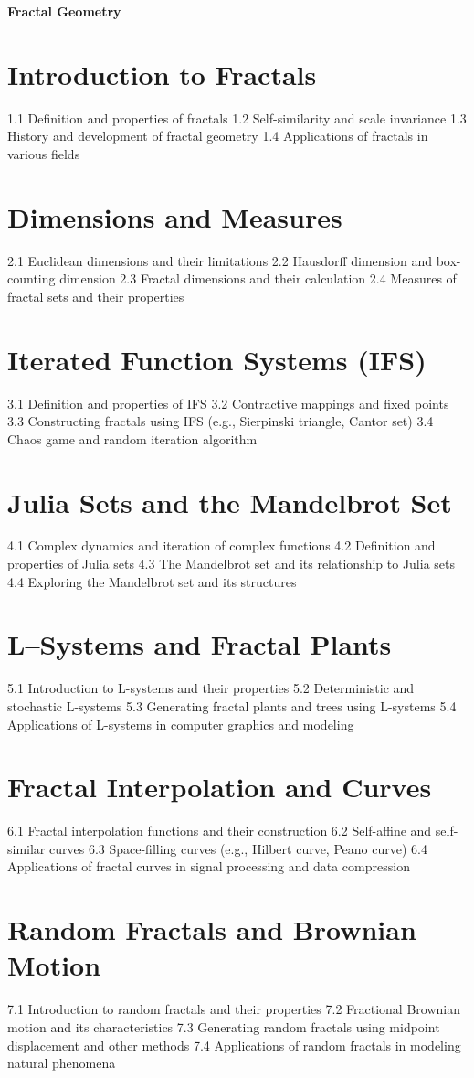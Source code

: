 {\LARGE \bf{Fractal Geometry}}
\section{Introduction to Fractals}
1.1 Definition and properties of fractals
1.2 Self-similarity and scale invariance
1.3 History and development of fractal geometry
1.4 Applications of fractals in various fields
\section{Dimensions and Measures}
2.1 Euclidean dimensions and their limitations
2.2 Hausdorff dimension and box-counting dimension
2.3 Fractal dimensions and their calculation
2.4 Measures of fractal sets and their properties
\section{Iterated Function Systems (IFS)}
3.1 Definition and properties of IFS
3.2 Contractive mappings and fixed points
3.3 Constructing fractals using IFS (e.g., Sierpinski triangle, Cantor set)
3.4 Chaos game and random iteration algorithm
\section{Julia Sets and the Mandelbrot Set}
4.1 Complex dynamics and iteration of complex functions
4.2 Definition and properties of Julia sets
4.3 The Mandelbrot set and its relationship to Julia sets
4.4 Exploring the Mandelbrot set and its structures
\section{L–Systems and Fractal Plants}
5.1 Introduction to L-systems and their properties
5.2 Deterministic and stochastic L-systems
5.3 Generating fractal plants and trees using L-systems
5.4 Applications of L-systems in computer graphics and modeling
\section{Fractal Interpolation and Curves}
6.1 Fractal interpolation functions and their construction
6.2 Self-affine and self-similar curves
6.3 Space-filling curves (e.g., Hilbert curve, Peano curve)
6.4 Applications of fractal curves in signal processing and data compression
\section{Random Fractals and Brownian Motion}
7.1 Introduction to random fractals and their properties
7.2 Fractional Brownian motion and its characteristics
7.3 Generating random fractals using midpoint displacement and other methods
7.4 Applications of random fractals in modeling natural phenomena
